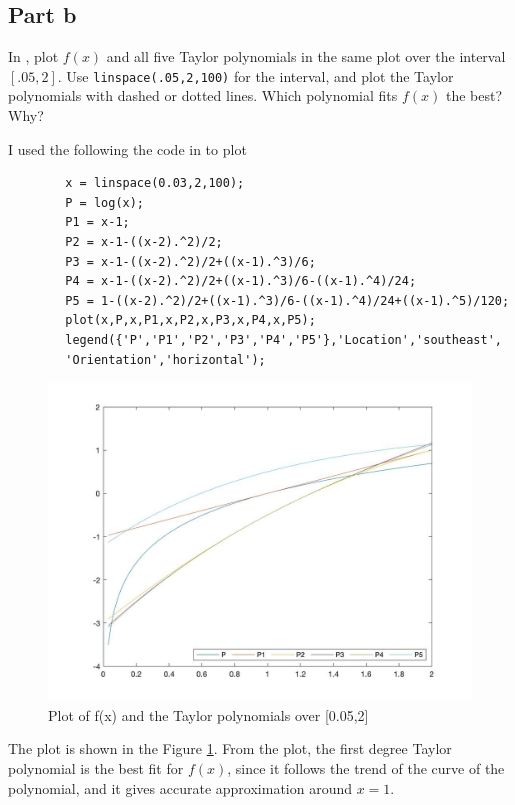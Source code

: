 \subsection{Part b}

\begin{question}
    In \MATLAB, plot $f(x)$ and all five Taylor polynomials in the same plot over the interval $[.05,2]$. Use \verb+linspace(.05,2,100)+ for the interval, and plot the Taylor polynomials with dashed or dotted lines. Which polynomial fits $f(x)$ the best? Why?
\end{question}

\begin{answer}
    I used the following the code in \MATLAB to plot
    \begin{verbatim}
        x = linspace(0.03,2,100);
        P = log(x);
        P1 = x-1;
        P2 = x-1-((x-2).^2)/2;
        P3 = x-1-((x-2).^2)/2+((x-1).^3)/6;
        P4 = x-1-((x-2).^2)/2+((x-1).^3)/6-((x-1).^4)/24;
        P5 = 1-((x-2).^2)/2+((x-1).^3)/6-((x-1).^4)/24+((x-1).^5)/120;
        plot(x,P,x,P1,x,P2,x,P3,x,P4,x,P5);
        legend({'P','P1','P2','P3','P4','P5'},'Location','southeast',
        'Orientation','horizontal');
    \end{verbatim}
    \begin{figure}[H]
        \centering
        \includegraphics[width=1.0\textwidth]{Figure 3.jpg}
        \caption{\label{fig:fig3}Plot of f(x) and the Taylor polynomials over [0.05,2]}
    \end{figure}
    The plot is shown in the Figure \ref{fig:fig3}. From the plot, the first degree Taylor polynomial is the best fit for $f(x)$, since it follows the trend of the curve of the polynomial, and it gives accurate approximation around $x = 1$.
\end{answer}

